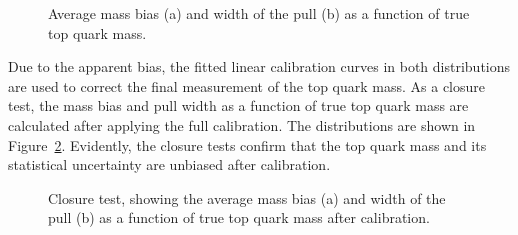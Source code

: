 \begin{figure}[!htp]
   \caption{Average mass bias (a) and width of the pull (b) as a function of true top quark mass.
   \label{fig:bias_pull_vs_mass}}
\end{figure}

Due to the apparent bias, the fitted linear calibration curves in both distributions are used to correct the final
measurement of the top quark mass. As a closure test, the mass bias and pull width as a function of true top quark mass
are calculated after applying the full calibration. The distributions are shown in
Figure~\ref{fig:calibrated_bias_pull_vs_mass}. Evidently, the closure tests confirm that the top quark mass and its
statistical uncertainty are unbiased after calibration.

\begin{figure}[!htp]
   \caption{Closure test, showing the average mass bias (a) and width of the pull (b) as a function of true top quark
            mass after calibration.
   \label{fig:calibrated_bias_pull_vs_mass}}
\end{figure}
 

